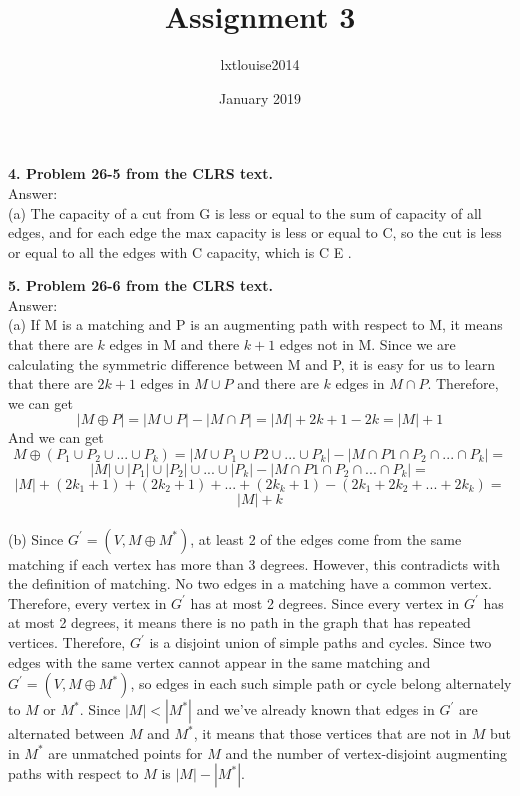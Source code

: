 \documentclass{article}
\title{Assignment 3}
\author{lxtlouise2014 }
\date{January 2019}
\begin{document}
\maketitle
\textbf{4. Problem 26-5 from the CLRS text.} \\
\noindent
Answer: \\
(a) The capacity of a cut from G is less or equal to the sum of capacity of all edges, and for each edge the max capacity is less or equal to C, so the cut is less or equal to all the edges with C capacity, which is C \mid E \mid.\\


\maketitle
\textbf{5. Problem 26-6 from the CLRS text.} \\
\noindent
Answer: \\
(a) If M is a matching and P is an augmenting path with respect to M, it means that there are $k$ edges in M and there $k + 1$ edges not in M. Since we are calculating the symmetric difference between M and P, it is easy for us to learn that there are $2k + 1$ edges in $M\cup P$ and there are $k$ edges in $M\cap P$. Therefore, we can get $$|M \oplus P| = |M\cup P| - |M\cap P| = |M| + 2k + 1 - 2k = |M| + 1$$ And we can get $$M \oplus (P_1\cup P_2 \cup ... \cup P_k )  = |M\cup P_1\cup P2\cup ... \cup P_k| - |M\cap P1\cap P_2\cap ... \cap P_k| = $$ $$|M|\cup |P_1|\cup |P_2|\cup ... \cup |P_k| -  |M\cap P1\cap P_2\cap ... \cap P_k| = $$ $$|M| + (2k_1 + 1) + (2k_2 + 1) + ... + (2k_k + 1) - (2k_1 + 2k_2 + ... + 2k_k) = $$ $$|M| + k$$ \\
(b) Since $G^{'} = (V, M\oplus M^{*})$, at least 2 of the edges come from the same matching if each vertex has more than 3 degrees. However, this contradicts with the definition of matching. No two edges in a matching have a common vertex. Therefore, every vertex in $G^{'}$ has at most 2 degrees. Since every vertex in $G^{'}$ has at most 2 degrees, it means there is no path in the graph that has repeated vertices. Therefore, $G^{'}$ is a disjoint union of simple paths and cycles. Since two edges with the same vertex cannot appear in the same matching and $G^{'} = (V, M\oplus M^{*})$, so edges in each such simple path or cycle belong alternately to $M$ or $M^{*}$. Since $|M| < |M^{*}|$ and we've already known that edges in $G^{'}$ are alternated between $M$ and $M^{*}$, it means that those vertices that are not in $M$ but in $M^{*}$ are unmatched points for $M$ and the number of vertex-disjoint augmenting paths with respect to $M$ is $|M| - |M^{*}|$.\\ \newline
\end{document}
